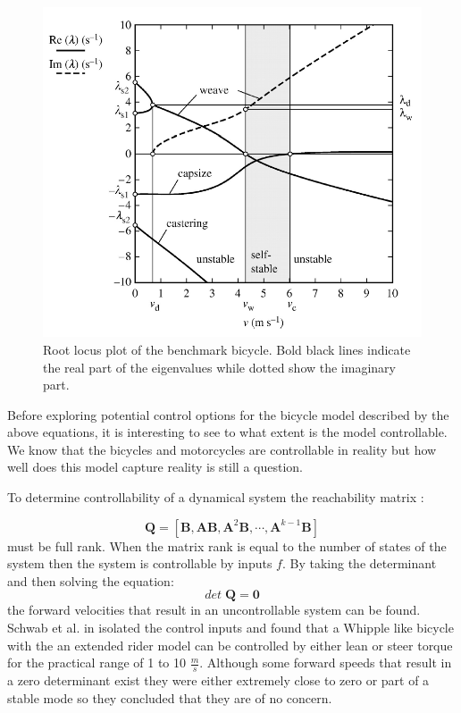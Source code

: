 \begin{figure}[ht]
    \centering
    \captionsetup{justification=centering,margin=2cm}

    \includegraphics[scale=0.6]{images/figure3_3.png}
    \caption{Root locus plot of the benchmark bicycle. Bold black lines indicate the real part of the eigenvalues while dotted show the imaginary part.\cite{meijaard2007linearized}}
    \label{fig:figure4}
\end{figure}

Before exploring potential control options for the bicycle model described by the above equations, it is interesting to see to what extent is the model controllable. We know that the bicycles and motorcycles are controllable in reality but how well does this model capture reality is still a question.

To determine controllability of a dynamical system the reachability matrix :

\begin{equation}
    \mathbf{Q}=\left[\mathbf{B}, \mathbf{A B}, \mathbf{A}^{2} \mathbf{B}, \cdots, \mathbf{A}^{k-1} \mathbf{B}\right]
    \end{equation}
must be full rank. When the matrix rank is equal to the number of states of the system then the system is controllable by inputs \ensuremath{f}. By taking the determinant and then solving the equation:
\begin{equation}
    det\; \mathbf{Q} = \mathbf{0}
\end{equation} 
the forward velocities that result in an uncontrollable system can be found. Schwab et al. in \cite{schwab2010controllability} isolated the control inputs and found that a Whipple like bicycle with the an extended rider model can be controlled by either lean or steer torque for the practical range of 1 to 10 \ensuremath{\frac{m}{s}}. Although some forward speeds that result in a zero determinant exist they were either extremely close to zero or part of a stable mode so they concluded that they are of no concern.




